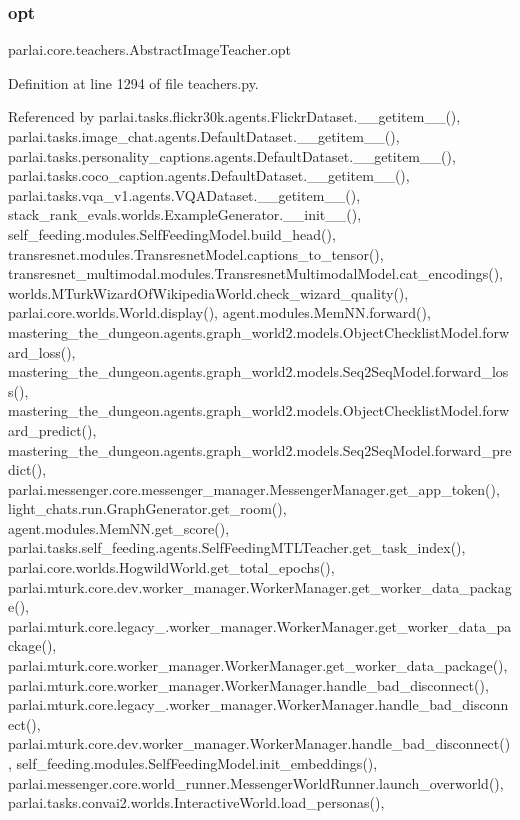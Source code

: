 \subsubsection{\texorpdfstring{opt}{opt}}
{\footnotesize\ttfamily parlai.\+core.\+teachers.\+Abstract\+Image\+Teacher.\+opt}



Definition at line 1294 of file teachers.\+py.



Referenced by parlai.\+tasks.\+flickr30k.\+agents.\+Flickr\+Dataset.\+\_\+\+\_\+getitem\+\_\+\+\_\+(), parlai.\+tasks.\+image\+\_\+chat.\+agents.\+Default\+Dataset.\+\_\+\+\_\+getitem\+\_\+\+\_\+(), parlai.\+tasks.\+personality\+\_\+captions.\+agents.\+Default\+Dataset.\+\_\+\+\_\+getitem\+\_\+\+\_\+(), parlai.\+tasks.\+coco\+\_\+caption.\+agents.\+Default\+Dataset.\+\_\+\+\_\+getitem\+\_\+\+\_\+(), parlai.\+tasks.\+vqa\+\_\+v1.\+agents.\+V\+Q\+A\+Dataset.\+\_\+\+\_\+getitem\+\_\+\+\_\+(), stack\+\_\+rank\+\_\+evals.\+worlds.\+Example\+Generator.\+\_\+\+\_\+init\+\_\+\+\_\+(), self\+\_\+feeding.\+modules.\+Self\+Feeding\+Model.\+build\+\_\+head(), transresnet.\+modules.\+Transresnet\+Model.\+captions\+\_\+to\+\_\+tensor(), transresnet\+\_\+multimodal.\+modules.\+Transresnet\+Multimodal\+Model.\+cat\+\_\+encodings(), worlds.\+M\+Turk\+Wizard\+Of\+Wikipedia\+World.\+check\+\_\+wizard\+\_\+quality(), parlai.\+core.\+worlds.\+World.\+display(), agent.\+modules.\+Mem\+N\+N.\+forward(), mastering\+\_\+the\+\_\+dungeon.\+agents.\+graph\+\_\+world2.\+models.\+Object\+Checklist\+Model.\+forward\+\_\+loss(), mastering\+\_\+the\+\_\+dungeon.\+agents.\+graph\+\_\+world2.\+models.\+Seq2\+Seq\+Model.\+forward\+\_\+loss(), mastering\+\_\+the\+\_\+dungeon.\+agents.\+graph\+\_\+world2.\+models.\+Object\+Checklist\+Model.\+forward\+\_\+predict(), mastering\+\_\+the\+\_\+dungeon.\+agents.\+graph\+\_\+world2.\+models.\+Seq2\+Seq\+Model.\+forward\+\_\+predict(), parlai.\+messenger.\+core.\+messenger\+\_\+manager.\+Messenger\+Manager.\+get\+\_\+app\+\_\+token(), light\+\_\+chats.\+run.\+Graph\+Generator.\+get\+\_\+room(), agent.\+modules.\+Mem\+N\+N.\+get\+\_\+score(), parlai.\+tasks.\+self\+\_\+feeding.\+agents.\+Self\+Feeding\+M\+T\+L\+Teacher.\+get\+\_\+task\+\_\+index(), parlai.\+core.\+worlds.\+Hogwild\+World.\+get\+\_\+total\+\_\+epochs(), parlai.\+mturk.\+core.\+dev.\+worker\+\_\+manager.\+Worker\+Manager.\+get\+\_\+worker\+\_\+data\+\_\+package(), parlai.\+mturk.\+core.\+legacy\+\_.\+worker\+\_\+manager.\+Worker\+Manager.\+get\+\_\+worker\+\_\+data\+\_\+package(), parlai.\+mturk.\+core.\+worker\+\_\+manager.\+Worker\+Manager.\+get\+\_\+worker\+\_\+data\+\_\+package(), parlai.\+mturk.\+core.\+worker\+\_\+manager.\+Worker\+Manager.\+handle\+\_\+bad\+\_\+disconnect(), parlai.\+mturk.\+core.\+legacy\+\_.\+worker\+\_\+manager.\+Worker\+Manager.\+handle\+\_\+bad\+\_\+disconnect(), parlai.\+mturk.\+core.\+dev.\+worker\+\_\+manager.\+Worker\+Manager.\+handle\+\_\+bad\+\_\+disconnect(), self\+\_\+feeding.\+modules.\+Self\+Feeding\+Model.\+init\+\_\+embeddings(), parlai.\+messenger.\+core.\+world\+\_\+runner.\+Messenger\+World\+Runner.\+launch\+\_\+overworld(), parlai.\+tasks.\+convai2.\+worlds.\+Interactive\+World.\+load\+\_\+personas(), 